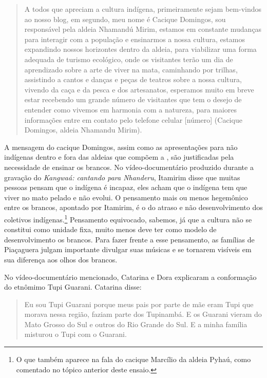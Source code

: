 \begin{quotation}
A todos que apreciam a cultura indígena, primeiramente sejam bem-vindos ao
nosso blog, em segundo, meu nome é Cacique Domingos, sou responsável
pela aldeia Nhamandú Mirim, estamos em constante mudanças para
interagir com a população e ensinarmos a nossa cultura, estamos
expandindo nossos horizontes dentro da aldeia, para viabilizar uma
forma adequada de turismo ecológico, onde os visitantes terão um dia de
aprendizado sobre a arte de viver na mata, caminhando por trilhas,
assistindo a cantos e danças e peças de teatros sobre a nossa cultura,
vivendo da caça e da pesca e dos artesanatos, esperamos muito em breve
estar recebendo um grande número de visitantes que tem o desejo de
entender como vivemos em harmonia com a natureza, para maiores
informações entre em contato pelo telefone celular [número] (Cacique
Domingos, aldeia Nhamandu Mirim).
\end{quotation}

A mensagem do cacique Domingos, assim como as apresentações para não
indígenas dentro e fora das aldeias que compõem a , são justificadas
pela necessidade de ensinar os brancos. No vídeo-documentário produzido
durante a gravação do  \emph{Kangwaá: cantando para Nhanderu}, Itamirim
disse que muitas pessoas pensam que o indígena é incapaz, eles acham
que o indígena tem que viver no mato pelado e não evolui. O pensamento
mais ou menos hegemônico entre os brancos, apontado por Itamirim, é o
do atraso e não desenvolvimento dos coletivos indígenas.\footnote{O que
também aparece na fala do cacique Marcílio da aldeia Pyhaú, como
comentado no tópico anterior deste ensaio.} Pensamento equivocado,
sabemos, já que a cultura não se constitui como unidade fixa, muito
menos deve ter como modelo de desenvolvimento os brancos. Para fazer
frente a esse pensamento, as famílias de Piaçaguera julgam importante
divulgar suas músicas e se tornarem visíveis em sua diferença aos olhos
dos brancos.

No vídeo-documentário mencionado, Catarina e Dora explicaram a
conformação do etnômimo Tupi Guarani. Catarina disse: 

\begin{quotation}
Eu sou Tupi Guarani porque meus pais por parte de mãe eram Tupi que
morava nessa região, faziam parte dos Tupinambá. E os Guarani vieram do
Mato Grosso do Sul e outros do Rio Grande do Sul. E a minha família
misturou o Tupi com o Guarani.
\end{quotation}

